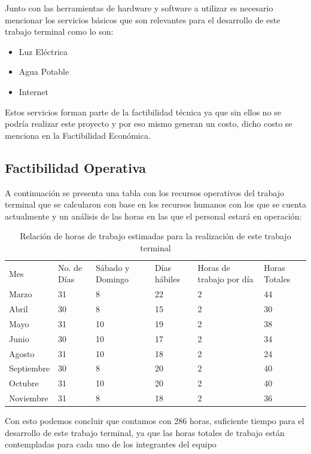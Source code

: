 \documentclass[12pt, a4paper, titlepage]{report}
\begin{document}
\newpage
    	Junto con las herramientas de hardware y software a utilizar es necesario mencionar los servicios b\'asicos que son relevantes para el desarrollo de este trabajo terminal como lo son:
    	\begin{itemize}
    		\item Luz Eléctrica
    		\item Agua Potable
    		\item Internet
    	\end{itemize}
    	Estos servicios forman parte de la factibilidad técnica ya que sin ellos no se podría realizar este proyecto y por eso mismo generan un costo, dicho costo se menciona en la Factibilidad Económica.
    	
    	\subsection{Factibilidad Operativa}
    	A continuación se presenta una tabla con los recursos operativos del trabajo terminal que se calcularon con base en los recursos humanos con los que se cuenta actualmente y un análisis de las horas en las que el personal estará en operación:
    	
    	\begin{table}[h!]
    		\begin{tabular}{|p{2cm}|p{1.4cm}|p{2.2cm}|p{1.6cm}|p{2.2cm}|p{1.6cm}|}
    			\hline    			
    			\rowcolor{guindapoli}
    			\multicolumn{6}{|c|}{\textbf{\textcolor{white}{Horas a trabajar en el desarrollo del trabajo terminal}}}\\
    			\hline
    			Mes & No. de Días & Sábado y Domingo & Días hábiles & Horas de trabajo por día & Horas Totales \\
    			\hline
    			Marzo & 31 & 8 & 22 & 2 & 44 \\ 
    			\hline
    			Abril & 30 & 8 & 15 & 2 & 30 \\ 
    			\hline
    			Mayo & 31 & 10 & 19 & 2 & 38 \\
    			\hline
    			Junio & 30 & 10 & 17 & 2 & 34 \\
    			\hline
    			Agosto & 31 & 10 & 18 & 2 & 24 \\
    			\hline
    			Septiembre & 30 & 8 & 20 & 2 & 40 \\ 
    			\hline
    			Octubre & 31 & 10 & 20 & 2 & 40 \\ 
    			\hline
    			Noviembre & 31 & 8 & 18 & 2 & 36 \\ 
    			\hline
    		\end{tabular}
    		\caption[Horas de trabajo]{Relación de horas de trabajo estimadas para la realización de este trabajo terminal}
    	\end{table}
    	Con esto podemos concluir que contamos con 286 horas, suficiente tiempo para el desarrollo de este trabajo terminal, ya que las horas totales de trabajo están contempladas para cada uno de los integrantes del equipo
    	
\end{document}
